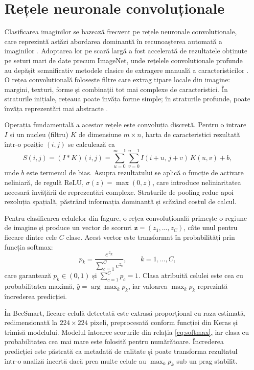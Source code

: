 \section{Rețele neuronale convoluționale}

Clasificarea imaginilor se bazează frecvent pe rețele neuronale convoluționale, care reprezintă astăzi abordarea dominantă în recunoașterea automată a imaginilor \cite{lecun2015deeplearning}. Adoptarea lor pe scară largă a fost accelerată de rezultatele obținute pe seturi mari de date precum ImageNet, unde rețelele convoluționale profunde au depășit semnificativ metodele clasice de extragere manuală a caracteristicilor \cite{krizhevsky2012imagenet}. O rețea convoluțională folosește filtre care extrag tipare locale din imagine: margini, texturi, forme și combinații tot mai complexe de caracteristici. În straturile inițiale, rețeaua poate învăța forme simple; în straturile profunde, poate învăța reprezentări mai abstracte \cite{Goodfellow-et-al-2016}.

Operația fundamentală a acestor rețele este convoluția discretă. Pentru o intrare $I$ și un nucleu (filtru) $K$ de dimensiune $m \times n$, harta de caracteristici rezultată într-o poziție $(i, j)$ se calculează ca
\begin{equation}
	S(i, j) = (I * K)(i, j) = \sum_{u=0}^{m-1} \sum_{v=0}^{n-1} I(i + u, \, j + v)\, K(u, v) + b,
	\label{eq:convolutie}
\end{equation}
unde $b$ este termenul de bias. Asupra rezultatului se aplică o funcție de activare neliniară, de regulă ReLU, $\sigma(z) = \max(0, z)$, care introduce neliniaritatea necesară învățării de reprezentări complexe. Straturile de pooling reduc apoi rezoluția spațială, păstrând informația dominantă și scăzând costul de calcul.

Pentru clasificarea celulelor din fagure, o rețea convoluțională primește o regiune de imagine și produce un vector de scoruri $\mathbf{z} = (z_1, \dots, z_C)$, câte unul pentru fiecare dintre cele $C$ clase. Acest vector este transformat în probabilități prin funcția softmax:
\begin{equation}
	p_k = \frac{e^{z_k}}{\sum_{c=1}^{C} e^{z_c}}, \qquad k = 1, \dots, C,
	\label{eq:softmax}
\end{equation}
care garantează $p_k \in (0, 1)$ și $\sum_{c=1}^{C} p_c = 1$. Clasa atribuită celulei este cea cu probabilitatea maximă, $\hat{y} = \arg\max_k p_k$, iar valoarea $\max_k p_k$ reprezintă încrederea predicției.

În BeeSmart, fiecare celulă detectată este extrasă proporțional cu raza estimată, redimensionată la $224 \times 224$ pixeli, preprocesată conform funcției  din Keras și trimisă modelului. Modelul întoarce scorurile din relația \eqref{eq:softmax}, iar clasa cu probabilitatea cea mai mare este folosită pentru numărătoare. Încrederea predicției este păstrată ca metadată de calitate și poate transforma rezultatul într-o analiză incertă dacă prea multe celule au $\max_k p_k$ sub un prag stabilit.


